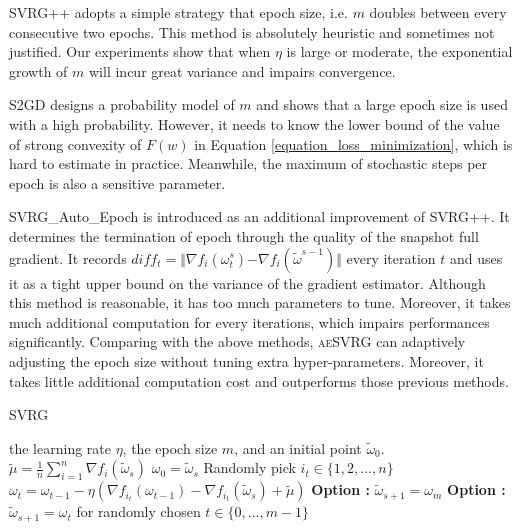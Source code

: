\documentclass[conference]{IEEEtran}
\begin{document}
SVRG++ adopts a simple strategy that epoch size, i.e. $m$ doubles between every consecutive two epochs. This method is absolutely heuristic and sometimes not justified. Our experiments show that when $\eta$ is large or moderate, the exponential growth of $m$ will incur great variance and impairs convergence. 

S2GD designs a probability model of $m$ and shows that a large epoch size is used with a high probability. However, it needs to know the lower bound of the value of strong convexity of $F(w)$ in Equation \ref{equation_loss_minimization}, which is hard to estimate in practice. Meanwhile, the maximum of stochastic steps per epoch is also a sensitive parameter. 

SVRG\_Auto\_Epoch is introduced as an additional improvement of SVRG++. It determines the termination of epoch through the quality of the snapshot full gradient. It records $diff_t = \Vert\nabla f_{i}(\omega_t^s)\mathrm{-}\nabla f_{i}(\tilde{\omega}^{s-1})\Vert$ every iteration $t$ and uses it as a tight upper bound on the variance of the gradient estimator. Although this method is reasonable, it has too much parameters to tune. Moreover, it takes much additional computation for every iterations, which impairs performances significantly. 
Comparing with the above methods, \textsc{aeSVRG} can adaptively adjusting the epoch size without tuning extra hyper-parameters. Moreover, it takes little additional computation cost and outperforms those previous methods.


 \begin{algorithm}[t]
 	\caption{\textsc{SVRG}}
	\label{SVRG}
	\begin{algorithmic}[1]
	\Require the learning rate $\eta$,  the epoch size $m$, and an initial point $\tilde{\omega}_0$.
		\State $\tilde{\mu} = \frac{1}{n}\sum\limits_{i=1}^{n}\nabla f_{i}(\tilde{\omega}_{s})$
		\State $\omega_0 = \tilde{\omega}_s$
			\State Randomly pick $i_t\in\{1, 2, ..., n\}$
			\State $\omega_t = \omega_{t-1} - \eta(\nabla f_{i_t}(\omega_{t-1}) - \nabla f_{i_t}(\tilde{\omega}_s)+\tilde{\mu})$
		\EndFor
		\State \textbf{Option \uppercase\expandafter{}:} $\tilde{\omega}_{s+1} = \omega_{m}$
		\State \textbf{Option \uppercase\expandafter{}:} $\tilde{\omega}_{s+1} = \omega_{t}$ for randomly chosen $t \in \{0, ... ,m - 1\}$ 
	\EndFor
	\end{algorithmic}
\end{algorithm}
\end{document}
